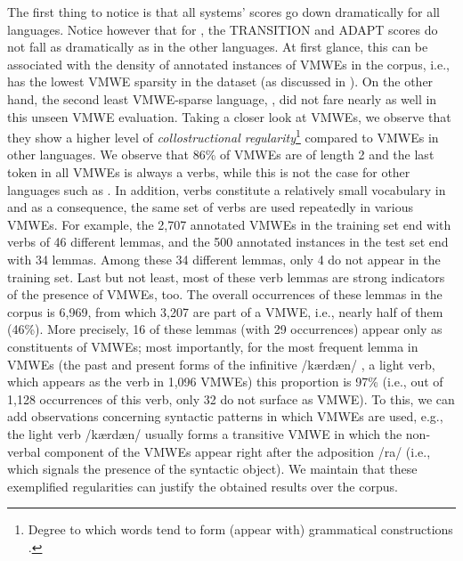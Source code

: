 \documentclass[output=paper,modfonts,nonflat,draftmode]{langsci/langscibook}
\begin{document}
The first thing to notice is that all systems' scores go down dramatically for all languages. Notice however that for , the TRANSITION and ADAPT scores do not fall as dramatically as in the other languages. At first glance, this can be associated with the density of annotated instances of VMWEs in the  corpus, i.e.,  has the lowest VMWE sparsity in the dataset (as discussed in ). On the other hand, the second least VMWE-sparse language, , did not fare nearly as well in this unseen VMWE evaluation. Taking a closer look at  VMWEs, we observe that they show a higher level of \emph{collostructional regularity}\footnote{Degree to which words tend to form (appear with) grammatical constructions \citep{collostructional}.} compared to VMWEs in other languages. We observe that 86\% of  VMWEs are of length 2 and the last token in all  VMWEs is always a verbs, while this is not the case for other languages such as . In addition, verbs constitute a relatively small vocabulary in  and as a consequence, the same set of verbs are used repeatedly in various VMWEs. For example, the 2,707 annotated VMWEs in the  training set end with verbs of 46 different lemmas, and the 500 annotated instances in the test set end with 34 lemmas. Among these 34 different lemmas, only 4 do not appear in the training set. Last but not least, most of these verb lemmas are strong indicators of the presence of VMWEs, too. The overall occurrences of these lemmas in the  corpus is 6,969, from which 3,207 are part of a VMWE, i.e., nearly half of them (46\%). More precisely, 16 of these lemmas (with 29 occurrences) appear only as constituents of VMWEs; most importantly, for the most frequent lemma in VMWEs (the past and present forms of the infinitive {} /kærdæn/ , a light verb, which appears as the verb in 1,096 VMWEs) this proportion is 97\% (i.e., out of 1,128 occurrences of this verb, only 32 do not surface as VMWE). To this, we can add observations concerning syntactic patterns in which VMWEs are used, e.g., the light verb {} /kærdæn/ usually forms a transitive VMWE in which the non-verbal component of the VMWEs appear right after the adposition  {} /ra/ (i.e., which signals the presence of the syntactic object).  We maintain that these exemplified regularities can justify the obtained results over the  corpus.  
\end{document}
